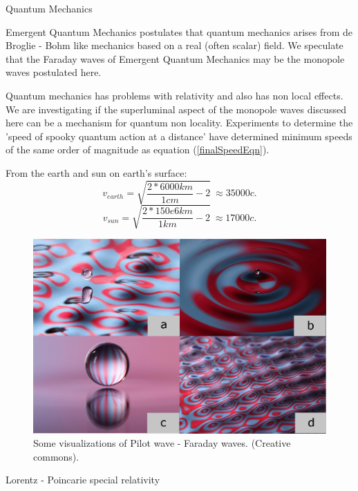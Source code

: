 \documentclass[final]{beamer}
\newlength{\colwidth}
\begin{document}
\begin{frame}[t]
\begin{columns}[t]
\begin{column}{\colwidth}
  \begin{block}{Quantum Mechanics}
  
  Emergent Quantum Mechanics postulates that quantum mechanics arises from de Broglie - Bohm like mechanics based on a real (often scalar) field\cite{Bush2015a}. We speculate that the Faraday waves of Emergent Quantum Mechanics may be the monopole waves postulated here. 
  
  Quantum mechanics has problems with relativity and also has non local effects. We are investigating if the superluminal aspect of the monopole waves discussed here can be a mechanism for quantum non locality. Experiments to determine the 'speed of spooky quantum action at a distance'\cite{salartTestingSpeedSpooky2008a} have determined minimum speeds of the same order of magnitude as equation (\ref{finalSpeedEqn}).
   
From the earth and sun on earth's surface:
  \begin{equation}
 v_{earth} = \sqrt{\frac{2*6000km}{1 cm} - 2} \ \approx 35000c .
\end{equation}
\begin{equation}
 v_{sun} = \sqrt{\frac{2*150e6km}{1 km} - 2} \ \approx 17000c .
\end{equation}

      \begin{figure}
\includegraphics[width=0.9\columnwidth]{bush-waves.png}
\caption{Some visualizations of Pilot wave - Faraday waves. (Creative commons). \cite{Bush2015a}}
\label{bush-faraday}
\end{figure} 

  
\begin{alertblock}{Lorentz - Poincarie special relativity}


\end{alertblock}
\end{block}
\end{column}
\end{columns}
\end{frame}
\end{document}
